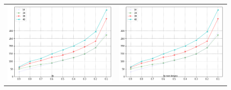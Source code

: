 \documentclass{article}
\begin{document}
    \begin{table}[h!]
        \begin{tabular}{p{0.45\linewidth}p{0.45\linewidth}}
            \includegraphics[width=\linewidth]{fp1} & \includegraphics[width=\linewidth]{fp1_non_binary}\\ 
        \end{tabular}
    \end{table}
\end{document}
